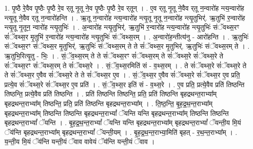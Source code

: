 \documentclass[17pt]{extarticle}
\begin{document}
1. पृ॒ष्ठै रे॒वैव पृ॒ष्ठैः पृ॒ष्ठै रे॒व र्‌तू नृ॒तू ने॒व पृ॒ष्ठैः पृ॒ष्ठै रे॒व र्‌तून् । . ए॒व र्‌तू नृ॒तू ने॒वैव र्‌तू न॒न्वारो॑ह न्त्य॒न्वारो॑ह न्त्यृ॒तू ने॒वैव र्‌तू न॒न्वारो॑हन्ति । . ऋ॒तू न॒न्वारो॑ह न्त्य॒न्वारो॑ह न्त्यृ॒तू नृ॒तू न॒न्वारो॑ह न्त्यृ॒तुभिर्॑. ऋ॒तुभि॑ र॒न्वारो॑ह न्त्यृ॒तू नृ॒तून॒ न्वारो॑ह न्त्यृ॒तुभिः॑ । . अ॒न्वारो॑ह न्त्यृ॒तुभिर्॑. ऋ॒तुभि॑ र॒न्वारो॑ह न्त्य॒न्वारो॑ह न्त्यृ॒तुभिः॑ संॅवथ्स॒रꣳ सं॑ॅवथ्स॒र मृ॒तुभि॑ र॒न्वारो॑ह न्त्य॒न्वारो॑ह न्त्यृ॒तुभिः॑ संॅवथ्स॒रम् । . अ॒न्वारो॑ह॒न्तीत्य॑नु - आरो॑हन्ति । . ऋ॒तुभिः॑ संॅवथ्स॒रꣳ सं॑ॅवथ्स॒र मृ॒तुभिर्॑. ऋ॒तुभिः॑ संॅवथ्स॒रम् ते ते सं॑ॅवथ्स॒र मृ॒तुभिर्॑. ऋ॒तुभिः॑ संॅवथ्स॒रम् ते । . ऋ॒तुभि॒रित्यृ॒तु - भिः॒ । . सं॒ॅव॒थ्स॒रम् ते ते सं॑ॅवथ्स॒रꣳ सं॑ॅवथ्स॒रम् ते सं॑ॅवथ्स॒रे सं॑ॅवथ्स॒रे ते सं॑ॅवथ्स॒रꣳ सं॑ॅवथ्स॒रम् ते सं॑ॅवथ्स॒रे । . सं॒ॅव॒थ्स॒रमिति॑ सं - व॒थ्स॒रम् । . ते सं॑ॅवथ्स॒रे सं॑ॅवथ्स॒रे ते ते सं॑ॅवथ्स॒र ए॒वैव सं॑ॅवथ्स॒रे ते ते सं॑ॅवथ्स॒र ए॒व । . सं॒ॅव॒थ्स॒र ए॒वैव सं॑ॅवथ्स॒रे सं॑ॅवथ्स॒र ए॒व प्रति॒ प्रत्ये॒व सं॑ॅवथ्स॒रे सं॑ॅवथ्स॒र ए॒व प्रति॑ । . सं॒ॅव॒थ्स॒र इति॑ सं - व॒थ्स॒रे । . ए॒व प्रति॒ प्रत्ये॒वैव प्रति॑ तिष्ठन्ति तिष्ठन्ति॒ प्रत्ये॒वैव प्रति॑ तिष्ठन्ति । . प्रति॑ तिष्ठन्ति तिष्ठन्ति॒ प्रति॒ प्रति॑ तिष्ठन्ति बृहद्रथन्त॒राभ्या᳚म् बृहद्रथन्त॒राभ्या᳚म् तिष्ठन्ति॒ प्रति॒ प्रति॑ तिष्ठन्ति बृहद्रथन्त॒राभ्या᳚म् । . ति॒ष्ठ॒न्ति॒ बृ॒ह॒द्र॒थ॒न्त॒राभ्या᳚म् बृहद्रथन्त॒राभ्या᳚म् तिष्ठन्ति तिष्ठन्ति बृहद्रथन्त॒राभ्यां᳚ ॅयन्ति यन्ति बृहद्रथन्त॒राभ्या᳚म् तिष्ठन्ति तिष्ठन्ति बृहद्रथन्त॒राभ्यां᳚ ॅयन्ति । . बृ॒ह॒द्र॒थ॒न्त॒राभ्यां᳚ ॅयन्ति यन्ति बृहद्रथन्त॒राभ्या᳚म् बृहद्रथन्त॒राभ्यां᳚ ॅयन्ती॒य मि॒यं ॅय॑न्ति बृहद्रथन्त॒राभ्या᳚म् बृहद्रथन्त॒राभ्यां᳚ ॅयन्ती॒यम् । . बृ॒ह॒द्र॒थ॒न्त॒राभ्या॒मिति॑ बृहत् - र॒थ॒न्त॒राभ्या᳚म् । . य॒न्ती॒य मि॒यं ॅय॑न्ति यन्ती॒यं ॅवाव वावेयं ॅय॑न्ति यन्ती॒यं ॅवाव । \newline
\end{document}
